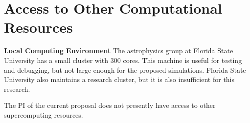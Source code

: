\section{Access to Other Computational Resources}

{\bf Local Computing Environment}  
The astrophysics group at Florida State
University has a small cluster with 300 cores.  This machine is useful for
testing and debugging, but not large enough for the proposed simulations.
Florida State University also maintains a research cluster, but it is also
insufficient for this research.


  The PI of the current proposal
does not presently have access to other supercomputing resources.

